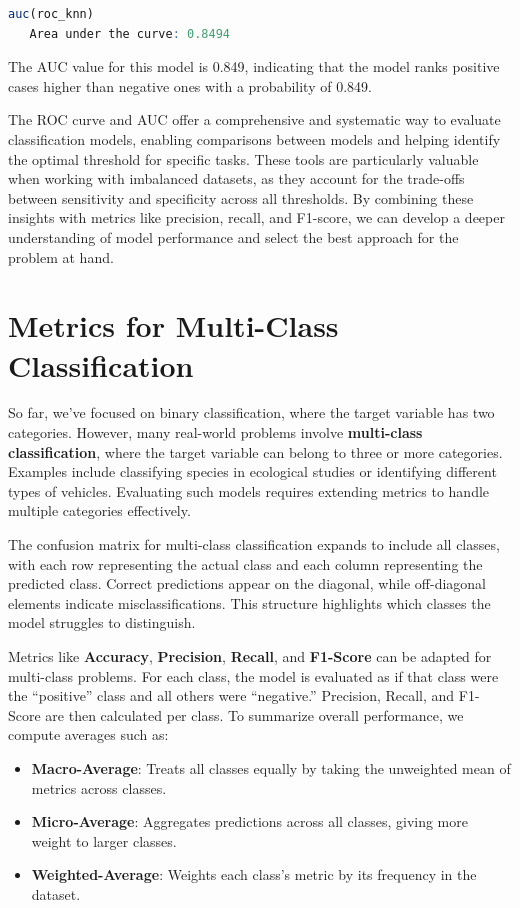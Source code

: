\documentclass[
]{book}
\providecommand{\tightlist}{%
  \setlength{\itemsep}{0pt}\setlength{\parskip}{0pt}}
\theoremstyle{definition}
\theoremstyle{definition}
\theoremstyle{definition}
\theoremstyle{definition}
\theoremstyle{remark}
\begin{document}
\begin{lstlisting}[language=R]
auc(roc_knn)
   Area under the curve: 0.8494
\end{lstlisting}

The AUC value for this model is 0.849, indicating that the model ranks positive cases higher than negative ones with a probability of 0.849.

The ROC curve and AUC offer a comprehensive and systematic way to evaluate classification models, enabling comparisons between models and helping identify the optimal threshold for specific tasks. These tools are particularly valuable when working with imbalanced datasets, as they account for the trade-offs between sensitivity and specificity across all thresholds. By combining these insights with metrics like precision, recall, and F1-score, we can develop a deeper understanding of model performance and select the best approach for the problem at hand.

\section{Metrics for Multi-Class Classification}\label{metrics-for-multi-class-classification}

So far, we've focused on binary classification, where the target variable has two categories. However, many real-world problems involve \textbf{multi-class classification}, where the target variable can belong to three or more categories. Examples include classifying species in ecological studies or identifying different types of vehicles. Evaluating such models requires extending metrics to handle multiple categories effectively.

The confusion matrix for multi-class classification expands to include all classes, with each row representing the actual class and each column representing the predicted class. Correct predictions appear on the diagonal, while off-diagonal elements indicate misclassifications. This structure highlights which classes the model struggles to distinguish.

Metrics like \textbf{Accuracy}, \textbf{Precision}, \textbf{Recall}, and \textbf{F1-Score} can be adapted for multi-class problems. For each class, the model is evaluated as if that class were the ``positive'' class and all others were ``negative.'' Precision, Recall, and F1-Score are then calculated per class. To summarize overall performance, we compute averages such as:

\begin{itemize}
\tightlist
\item
  \textbf{Macro-Average}: Treats all classes equally by taking the unweighted mean of metrics across classes.\\
\item
  \textbf{Micro-Average}: Aggregates predictions across all classes, giving more weight to larger classes.\\
\item
  \textbf{Weighted-Average}: Weights each class's metric by its frequency in the dataset.
\end{itemize}
\end{document}
